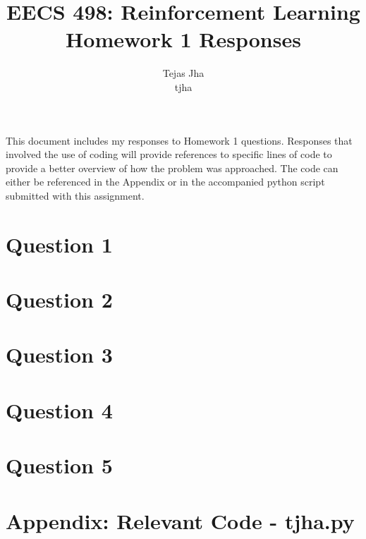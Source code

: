 \documentclass[11pt]{article}
\title{EECS 498: Reinforcement Learning \protect \\ Homework 1 Responses}
\author{Tejas Jha \\ tjha}
\begin{document}
\maketitle

This document includes my responses to Homework 1 questions. Responses that involved the use of coding will provide references to specific lines of code to provide a better overview of how the problem was approached. The code can either be referenced in the Appendix or in the accompanied python script submitted with this assignment.

\section*{Question 1}

\section*{Question 2}

\section*{Question 3}

\section*{Question 4}

\section*{Question 5}




\section*{Appendix: Relevant Code - tjha.py}
   
\end{document}
